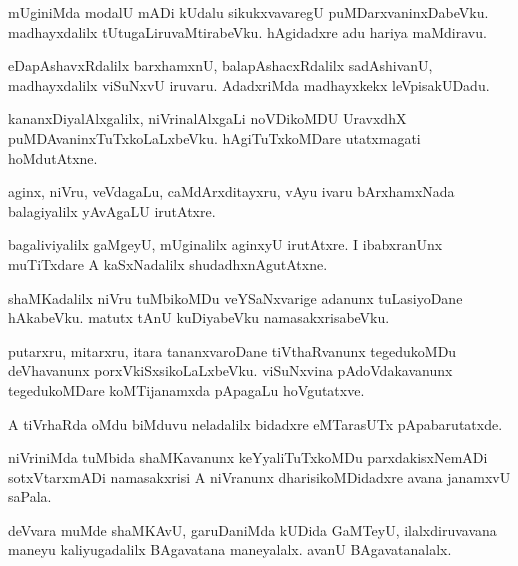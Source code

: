 \documentclass{article}
\begin{document}
\begin{mn}%
mUginiMda modalU mADi kUdalu sikukxvavaregU puMDarxvaninxDabeVku. madhayxdalilx 
tUtugaLiruvaMtirabeVku. hAgidadxre adu hariya maMdiravu.
\end{mn}

\begin{mn}%
eDapAshavxRdalilx barxhamxnU, balapAshacxRdalilx sadAshivanU, madhayxdalilx viSuNxvU iruvaru. AdadxriMda madhayxkekx leVpisakUDadu.
\end{mn}

\begin{mn}%
kananxDiyalAlxgalilx, niVrinalAlxgaLi noVDikoMDU UravxdhX puMDAvaninxTuTxkoLaLxbeVku. 
hAgiTuTxkoMDare utatxmagati hoMdutAtxne.
\end{mn}

\begin{mn}%
aginx, niVru, veVdagaLu, caMdArxditayxru, vAyu ivaru bArxhamxNada balagiyalilx yAvAgaLU 
irutAtxre.
\end{mn}

\begin{mn}%
bagaliviyalilx gaMgeyU, mUginalilx aginxyU irutAtxre. I ibabxranUnx muTiTxdare A 
kaSxNadalilx shudadhxnAgutAtxne.
\end{mn}

\begin{mn}%
shaMKadalilx niVru tuMbikoMDu veYSaNxvarige adanunx tuLasiyoDane hAkabeVku. matutx tAnU 
kuDiyabeVku namasakxrisabeVku.
\end{mn}

\begin{mn}%
putarxru, mitarxru, itara tananxvaroDane tiVthaRvanunx tegedukoMDu deVhavanunx 
porxVkiSxsikoLaLxbeVku. viSuNxvina pAdoVdakavanunx tegedukoMDare koMTijanamxda pApagaLu 
hoVgutatxve.
\end{mn}

\begin{mn}%
A tiVrhaRda oMdu biMduvu neladalilx bidadxre eMTarasUTx pApabarutatxde.
\end{mn}

\begin{mn}%
niVriniMda tuMbida shaMKavanunx keYyaliTuTxkoMDu parxdakisxNemADi sotxVtarxmADi 
namasakxrisi A niVranunx dharisikoMDidadxre avana janamxvU saPala.
\end{mn}

\begin{mn}%
deVvara muMde shaMKAvU, garuDaniMda kUDida GaMTeyU, ilalxdiruvavana maneyu kaliyugadalilx 
BAgavatana maneyalalx. avanU BAgavatanalalx.
\end{mn}
\end{document}
